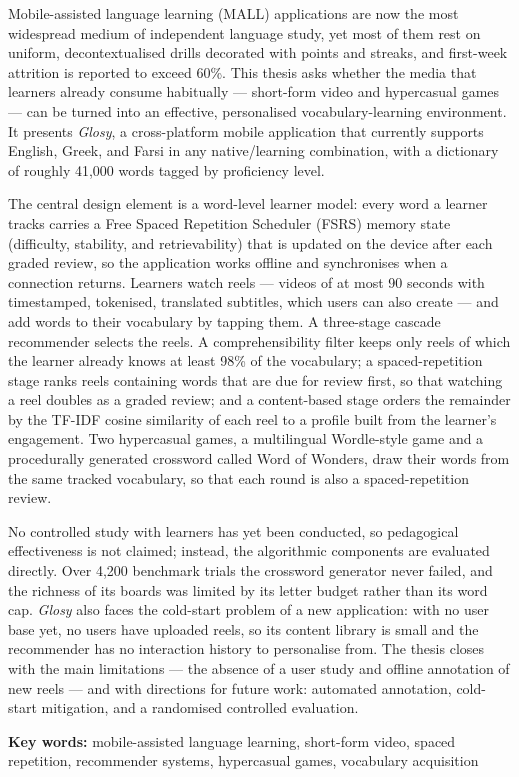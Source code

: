 
Mobile-assisted language learning (MALL) applications are now the most widespread medium of independent language study, yet most of them rest on uniform, decontextualised drills decorated with points and streaks, and first-week attrition is reported to exceed 60\%. This thesis asks whether the media that learners already consume habitually --- short-form video and hypercasual games --- can be turned into an effective, personalised vocabulary-learning environment. It presents \textit{Glosy}, a cross-platform mobile application that currently supports English, Greek, and Farsi in any native/learning combination, with a dictionary of roughly 41,000 words tagged by proficiency level.

The central design element is a word-level learner model: every word a learner tracks carries a Free Spaced Repetition Scheduler (FSRS) memory state (difficulty, stability, and retrievability) that is updated on the device after each graded review, so the application works offline and synchronises when a connection returns. Learners watch reels --- videos of at most 90 seconds with timestamped, tokenised, translated subtitles, which users can also create --- and add words to their vocabulary by tapping them. A three-stage cascade recommender selects the reels. A comprehensibility filter keeps only reels of which the learner already knows at least 98\% of the vocabulary; a spaced-repetition stage ranks reels containing words that are due for review first, so that watching a reel doubles as a graded review; and a content-based stage orders the remainder by the TF-IDF cosine similarity of each reel to a profile built from the learner's engagement. Two hypercasual games, a multilingual Wordle-style game and a procedurally generated crossword called Word of Wonders, draw their words from the same tracked vocabulary, so that each round is also a spaced-repetition review.

No controlled study with learners has yet been conducted, so pedagogical effectiveness is not claimed; instead, the algorithmic components are evaluated directly. Over 4,200 benchmark trials the crossword generator never failed, and the richness of its boards was limited by its letter budget rather than its word cap. \textit{Glosy} also faces the cold-start problem of a new application: with no user base yet, no users have uploaded reels, so its content library is small and the recommender has no interaction history to personalise from. The thesis closes with the main limitations --- the absence of a user study and offline annotation of new reels --- and with directions for future work: automated annotation, cold-start mitigation, and a randomised controlled evaluation.

\textbf{Key words:} mobile-assisted language learning, short-form video, spaced repetition, recommender systems, hypercasual games, vocabulary acquisition
